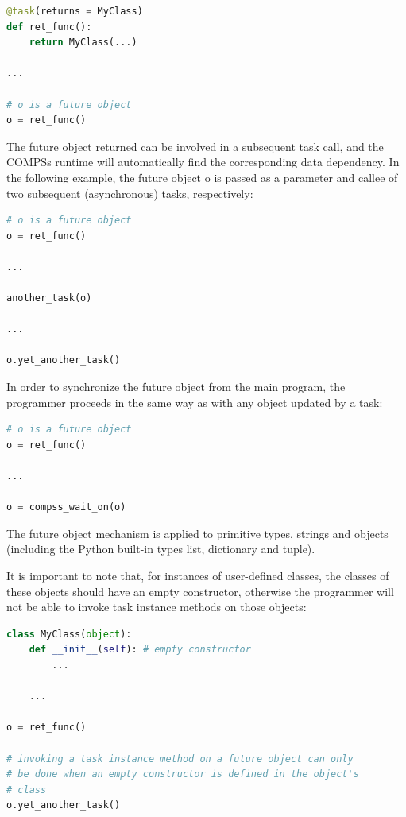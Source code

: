 \begin{lstlisting}[language=python]
@task(returns = MyClass)
def ret_func():
    return MyClass(...)

...

# o is a future object
o = ret_func()
\end{lstlisting}

The future object returned can be involved in a subsequent task call, and the COMPSs runtime will automatically find the corresponding data dependency. In the following example, the future object o is passed as a parameter and callee of two subsequent (asynchronous) tasks, respectively:

\begin{lstlisting}[language=python]
# o is a future object
o = ret_func()

...

another_task(o)

...

o.yet_another_task()
\end{lstlisting}

In order to synchronize the future object from the main program, the programmer proceeds in the same way as with any object updated by a task:

\begin{lstlisting}[language=python]
# o is a future object
o = ret_func()

...

o = compss_wait_on(o)
\end{lstlisting}
                         
The future object mechanism is applied to primitive types, strings and objects (including the Python built-in types list, dictionary and tuple).

It is important to note that, for instances of user-defined classes, the classes of these objects should have an empty constructor, otherwise the programmer will not be able to invoke task instance methods on those objects:
                                   
\begin{lstlisting}[language=python]
class MyClass(object):
    def __init__(self): # empty constructor
        ...
        
    ...

o = ret_func()

# invoking a task instance method on a future object can only
# be done when an empty constructor is defined in the object's
# class
o.yet_another_task()
\end{lstlisting}

